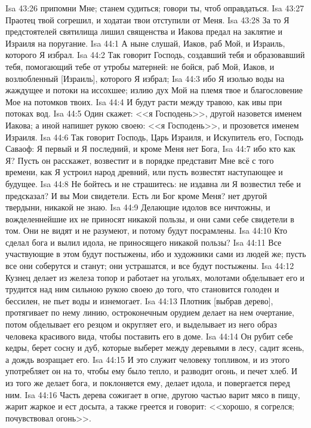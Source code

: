 \vs Isa 43:26 припомни Мне; станем судиться; говори ты, чтоб оправдаться.
\vs Isa 43:27 Праотец твой согрешил, и ходатаи твои отступили от Меня.
\vs Isa 43:28 За то Я предстоятелей святилища лишил священства и Иакова предал на заклятие и Израиля на поругание.
\vs Isa 44:1 А ныне слушай, Иаков, раб Мой, и Израиль, которого Я избрал.
\vs Isa 44:2 Так говорит Господь, создавший тебя и образовавший тебя, помогающий тебе от утробы матерней: не бойся, раб Мой, Иаков, и возлюбленный [Израиль], которого Я избрал;
\vs Isa 44:3 ибо Я изолью воды на жаждущее и потоки на иссохшее; излию дух Мой на племя твое и благословение Мое на потомков твоих.
\vs Isa 44:4 И будут расти между травою, как ивы при потоках вод.
\vs Isa 44:5 Один скажет: <<я Господень>>, другой назовется именем Иакова; а иной напишет рукою своею: <<я Господень>>, и прозовется именем Израиля.
\rsbpar\vs Isa 44:6 Так говорит Господь, Царь Израиля, и Искупитель его, Господь Саваоф: Я первый и Я последний, и кроме Меня нет Бога,
\vs Isa 44:7 ибо кто как Я? Пусть он расскажет, возвестит и в порядке представит Мне всё с того времени, как Я устроил народ древний, или пусть возвестят наступающее и будущее.
\vs Isa 44:8 Не бойтесь и не страшитесь: не издавна ли Я возвестил тебе и предсказал? И вы Мои свидетели. Есть ли Бог кроме Меня? нет другой твердыни, никакой не знаю.
\vs Isa 44:9 Делающие идолов все ничтожны, и вожделеннейшие их не приносят никакой пользы, и они сами себе свидетели в том. Они не видят и не разумеют, и потому будут посрамлены.
\vs Isa 44:10 Кто сделал бога и вылил идола, не приносящего никакой пользы?
\vs Isa 44:11 Все участвующие в этом будут постыжены, ибо и художники сами из людей же; пусть все они соберутся и станут; они устрашатся, и все будут постыжены.
\vs Isa 44:12 Кузнец делает из железа топор и работает на угольях, молотами обделывает его и трудится над ним сильною рукою своею до того, что становится голоден и бессилен, не пьет воды и изнемогает.
\vs Isa 44:13 Плотник [выбрав дерево], протягивает по нему линию, остроконечным орудием делает на нем очертание, потом обделывает его резцом и округляет его, и выделывает из него образ человека красивого вида, чтобы поставить его в доме.
\vs Isa 44:14 Он рубит себе кедры, берет сосну и дуб, которые выберет между деревьями в лесу, садит ясень, а дождь возращает его.
\vs Isa 44:15 И это служит человеку топливом, и  из этого употребляет он на то, чтобы ему было тепло, и разводит огонь, и печет хлеб. И из того же делает бога, и поклоняется ему, делает идола, и повергается перед ним.
\vs Isa 44:16 Часть дерева сожигает в огне, другою частью варит мясо в пищу, жарит жаркое и ест досыта, а также греется и говорит: <<хорошо, я согрелся; почувствовал огонь>>.
